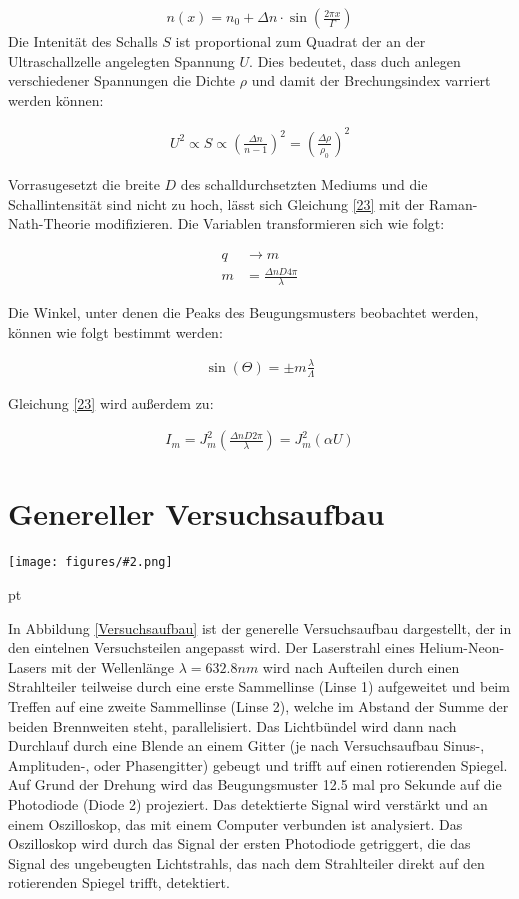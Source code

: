 \documentclass[12pt]{article}
\newcommand{\gra}[3][0.7]{
	\begin{minipage}[h!]{\textwidth}
		\centering
		\texttt{[image: figures/\#2.png]}
		\captionof{figure}{#3}
	\end{minipage}
	\vskip 30 pt
}
\begin{document}
\begin{align}
n\left(x \right) = n_0 + \Delta n \cdot \sin \left(\frac{2 \pi x}{\Gamma} \right) 
\end{align}
Die Intenität des Schalls $S$ ist proportional zum Quadrat der an der Ultraschallzelle angelegten Spannung $ U$. Dies bedeutet, dass duch anlegen verschiedener Spannungen die Dichte $\rho$ und damit der Brechungsindex varriert werden können:

\begin{align}
U^2 \propto S \propto \left( \frac{\Delta n}{n -1} \right)^2 = \left( \frac{\Delta \rho}{\rho_0}\right)^2  
\end{align}

Vorrasugesetzt die breite $D$ des schalldurchsetzten Mediums und die Schallintensität sind nicht zu hoch, lässt sich Gleichung \ref{23} mit der Raman-Nath-Theorie modifizieren. Die Variablen transformieren sich wie folgt:

\begin{align}
q &\rightarrow m\\
m &= \frac{\Delta n D 4 \pi}{\lambda}
\end{align}

Die Winkel, unter denen die Peaks des Beugungsmusters beobachtet werden, können wie folgt bestimmt werden:

\begin{align}
\sin\left( \Theta\right) = \pm m \frac{\lambda}{\Lambda}
\end{align}

Gleichung \ref{23} wird außerdem zu:

\begin{align}
I_m = J_m^2 \left( \frac{\Delta n D 2 \pi}{\lambda} \right) = J_m^2\left(\alpha U \right) 
\end{align}
\newpage
\section{Genereller Versuchsaufbau}

\gra{Versuchsaufbau}{Versuchsaufbau \label{Versuchsaufbau}}

In Abbildung \ref{Versuchsaufbau} ist der generelle Versuchsaufbau dargestellt, der in den eintelnen Versuchsteilen angepasst wird.
Der Laserstrahl eines Helium-Neon-Lasers mit der Wellenlänge $\lambda = 632.8 nm$ wird nach Aufteilen durch einen Strahlteiler  teilweise durch eine erste Sammellinse (Linse 1) aufgeweitet und beim Treffen auf eine zweite Sammellinse (Linse 2), welche im Abstand der Summe der beiden Brennweiten steht, parallelisiert. Das Lichtbündel wird dann nach Durchlauf durch eine Blende an einem Gitter (je nach Versuchsaufbau Sinus-, Amplituden-, oder Phasengitter) gebeugt und trifft auf einen rotierenden Spiegel. Auf Grund der Drehung wird das Beugungsmuster 12.5 mal pro Sekunde auf die Photodiode (Diode 2) projeziert. Das detektierte Signal wird verstärkt und an einem Oszilloskop, das mit einem Computer verbunden ist analysiert. Das Oszilloskop wird durch das Signal der ersten Photodiode getriggert, die das Signal des ungebeugten Lichtstrahls, das nach dem Strahlteiler direkt auf den rotierenden Spiegel trifft, detektiert.
\end{document}
